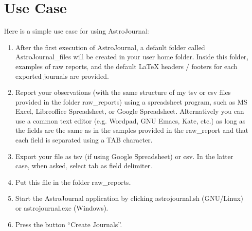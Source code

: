 \section{Use Case}
\label{sec:Use Case}
Here is a simple use case for using AstroJournal:\\
\begin{enumerate}
 \item After the first execution of AstroJournal, a default folder called AstroJournal\_files will be created in your user home folder. Inside this folder, examples of raw reports, and the default LaTeX headers / footers for each exported journals are provided. 
 \item Report your observations (with the same structure of my tsv or csv files provided in the folder raw\_reports) using a spreadsheet program, such as MS Excel, Libreoffice Spreadsheet, or Google Spreadsheet. Alternatively you can use a common text editor (e.g. Wordpad, GNU Emacs, Kate, etc.) as long as the fields are the same as in the samples provided in the raw\_report and that each field is separated using a TAB character.
 \item Export your file as tsv (if using Google Spreadsheet) or csv. In the latter case, when asked, select tab as field delimiter.
 \item Put this file in the folder raw\_reports.
 \item Start the AstroJournal application by clicking astrojournal.sh (GNU/Linux) or astrojournal.exe (Windows).
 \item Press the button ``Create Journals''.
\end{enumerate}



